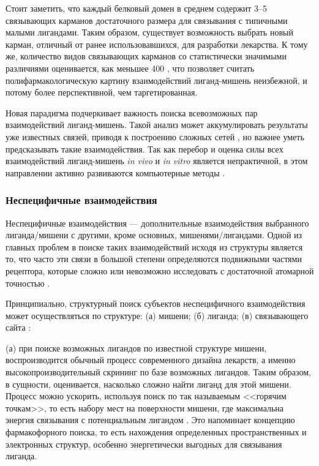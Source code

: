 \documentclass[a4paper,14pt]{article}         %
\begin{document}
Стоит заметить, что каждый белковый домен в среднем содержит 3--5 связывающих карманов достаточного размера для связывания с типичными малыми лигандами\cite{Skolnick2015}. Таким образом, существует возможность выбрать новый карман, отличный от ранее использовавшихся, для разработки лекарства. К тому же, количество видов связывающих карманов со статистически значимыми различиями оценивается, как меньшее 400 \cite{Skolnick2015}, что позволяет считать полифармакологическую картину взаимодействий лиганд-мишень неизбежной, и потому более перспективной, чем таргетированная.

Новая парадигма подчеркивает важность поиска всевозможных пар взаимодействий лиганд-мишень. Такой анализ может аккумулировать результаты уже известных связей, приводя к построению сложных сетей \cite{Anighoro2014}, но важнее уметь предсказывать такие взаимодействия. Так как перебор и оценка силы всех взаимодействий лиганд-мишень \textit{in vivo} и \textit{in vitro} является непрактичной, в этом направлении активно развиваются компьютерные методы \cite{Chaudhari}.

\subsubsection{Неспецифичные взаимодействия}
Неспецифичные взаимодействия --- дополнительные взаимодействия выбранного лиганда/мишени с другими, кроме основных, мишенями/лигандами. Одной из главных проблем в поиске таких взаимодействий исходя из структуры является то, что часто эти связи в большой степени определяются подвижными частями рецептора, которые сложно или невозможно исследовать с достаточной атомарной точностью \cite{Loving}.

Принципиально, структурный поиск субъектов неспецифичного взаимодействия может осуществляться по структуре: (а) мишени; (б) лиганда; (в) связывающего сайта \cite{Rognan2010}:

(а) при поиске возможных лигандов по известной структуре мишени, воспроизводится обычный процесс современного дизайна лекарств, а именно высокопроизводительный скрининг по базе возможных лигандов. Таким образом, в сущности, оценивается, насколько сложно найти лиганд для этой мишени. Процесс можно ускорить, используя поиск по так называемым <<горячим точкам>>, то есть набору мест на поверхности мишени, где максимальна энергия связывания с потенциальным лигандом \cite{Hall2015}. Это напоминает концепцию фармакофорного поиска, то есть нахождения определенных пространственных и электронных структур, особенно энергетически выгодных для связывания лиганда.
\end{document}

